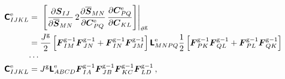 \documentclass[10pt,letterpaper,oneside]{report}
\newcommand{\ten}[1]{\mbox{\boldmath $#1$}{}}
\newcommand{\tenf}[1]{\mbox{{\sffamily{\bfseries {#1}}}}}
\newcommand{\scas}[1]{\mbox{{\scriptsize{${\rm{#1}}$}}}{}}
\begin{document}
\begin{align}
\tenf{C}^{\scas{e}}_{IJKL} ={}& \left. \left[ \frac{ \partial \ten{S}_{IJ} }{ \partial \overline{\ten{S}}_{MN} } \, 2 \frac{ \partial \overline{\ten{S}}_{MN} }{ \partial \ten{C}^{\scas{e}}_{PQ} } \, \frac{ \partial \ten{C}^{\scas{e}}_{PQ} }{ \partial \ten{C}_{KL} } \right] \right|_{\vartheta^{\scas{g}}} 
\\
={}& \frac{J^{\scas{g}}}{2} \left[ \ten{F}^{\scas{g}-1}_{IM} \ten{F}^{\scas{g}-1}_{JN} + \ten{F}^{\scas{g}-1}_{IN} \ten{F}^{\scas{g}-1}_{JM} \right] \tenf{L}^{\scas{e}}_{MNPQ} \frac{1}{2} \left[ \ten{F}^{\scas{g}-1}_{PK} \ten{F}^{\scas{g}-1}_{QL} + \ten{F}^{\scas{g}-1}_{PL} \ten{F}^{\scas{g}-1}_{QK} \right] 
\notag \\
\cdots{}& \notag \\
\tenf{C}^{\scas{e}}_{IJKL} ={}& J^{\scas{g}} \tenf{L}^{\scas{e}}_{ABCD} \ten{F}^{\scas{g}-1}_{IA} \ten{F}^{\scas{g}-1}_{JB} \ten{F}^{\scas{g}-1}_{KC} \ten{F}^{\scas{g}-1}_{LD} \, , 
\end{align}
\end{document}
